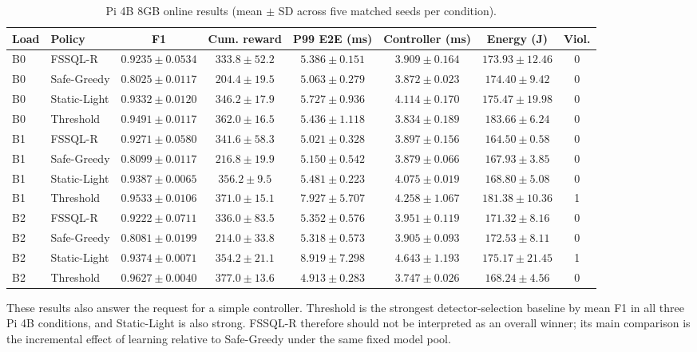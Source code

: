 \documentclass[journal]{IEEEtran}
\begin{document}
\begin{table}[t]
\caption{Pi 4B 8GB online results (mean $\pm$ SD across five matched seeds per condition).}
\label{tab:pi4}
\centering\footnotesize
\begin{tabular}{llcccccc}
\toprule
Load & Policy & F1 & Cum. reward & P99 E2E (ms) & Controller (ms) & Energy (J) & Viol. \\
\midrule
B0 & FSSQL-R & $0.9235\pm0.0534$ & $333.8\pm52.2$ & $5.386\pm0.151$ & $3.909\pm0.164$ & $173.93\pm12.46$ & 0 \\
B0 & Safe-Greedy & $0.8025\pm0.0117$ & $204.4\pm19.5$ & $5.063\pm0.279$ & $3.872\pm0.023$ & $174.40\pm9.42$ & 0 \\
B0 & Static-Light & $0.9332\pm0.0120$ & $346.2\pm17.9$ & $5.727\pm0.936$ & $4.114\pm0.170$ & $175.47\pm19.98$ & 0 \\
B0 & Threshold & $\mathbf{0.9491\pm0.0117}$ & $\mathbf{362.0\pm16.5}$ & $5.436\pm1.118$ & $3.834\pm0.189$ & $183.66\pm6.24$ & 0 \\
\midrule
B1 & FSSQL-R & $0.9271\pm0.0580$ & $341.6\pm58.3$ & $5.021\pm0.328$ & $3.897\pm0.156$ & $164.50\pm0.58$ & 0 \\
B1 & Safe-Greedy & $0.8099\pm0.0117$ & $216.8\pm19.9$ & $5.150\pm0.542$ & $3.879\pm0.066$ & $167.93\pm3.85$ & 0 \\
B1 & Static-Light & $0.9387\pm0.0065$ & $356.2\pm9.5$ & $5.481\pm0.223$ & $4.075\pm0.019$ & $168.80\pm5.08$ & 0 \\
B1 & Threshold & $\mathbf{0.9533\pm0.0106}$ & $\mathbf{371.0\pm15.1}$ & $7.927\pm5.707$ & $4.258\pm1.067$ & $181.38\pm10.36$ & 1 \\
\midrule
B2 & FSSQL-R & $0.9222\pm0.0711$ & $336.0\pm83.5$ & $5.352\pm0.576$ & $3.951\pm0.119$ & $171.32\pm8.16$ & 0 \\
B2 & Safe-Greedy & $0.8081\pm0.0199$ & $214.0\pm33.8$ & $5.318\pm0.573$ & $3.905\pm0.093$ & $172.53\pm8.11$ & 0 \\
B2 & Static-Light & $0.9374\pm0.0071$ & $354.2\pm21.1$ & $8.919\pm7.298$ & $4.643\pm1.193$ & $175.17\pm21.45$ & 1 \\
B2 & Threshold & $\mathbf{0.9627\pm0.0040}$ & $\mathbf{377.0\pm13.6}$ & $\mathbf{4.913\pm0.283}$ & $\mathbf{3.747\pm0.026}$ & $168.24\pm4.56$ & 0 \\
\bottomrule
\end{tabular}
\end{table}

These results also answer the request for a simple controller. Threshold is the strongest detector-selection baseline by mean F1 in all three Pi 4B conditions, and Static-Light is also strong. FSSQL-R therefore should not be interpreted as an overall winner; its main comparison is the incremental effect of learning relative to Safe-Greedy under the same fixed model pool.
\end{document}
